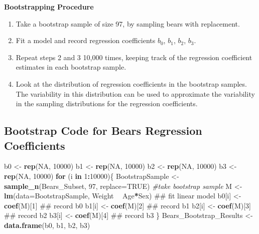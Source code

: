 \documentclass[]{book}
\newenvironment{Shaded}{\begin{snugshade}}{\end{snugshade}}
\newcommand{\KeywordTok}[1]{\textcolor[rgb]{0.13,0.29,0.53}{\textbf{#1}}}
\newcommand{\DataTypeTok}[1]{\textcolor[rgb]{0.13,0.29,0.53}{#1}}
\newcommand{\DecValTok}[1]{\textcolor[rgb]{0.00,0.00,0.81}{#1}}
\newcommand{\StringTok}[1]{\textcolor[rgb]{0.31,0.60,0.02}{#1}}
\newcommand{\CommentTok}[1]{\textcolor[rgb]{0.56,0.35,0.01}{\textit{#1}}}
\newcommand{\OtherTok}[1]{\textcolor[rgb]{0.56,0.35,0.01}{#1}}
\newcommand{\ControlFlowTok}[1]{\textcolor[rgb]{0.13,0.29,0.53}{\textbf{#1}}}
\newcommand{\OperatorTok}[1]{\textcolor[rgb]{0.81,0.36,0.00}{\textbf{#1}}}
\newcommand{\NormalTok}[1]{#1}
\begin{document}
\textbf{Bootstrapping Procedure}

\begin{enumerate}
\def\labelenumi{\arabic{enumi}.}
\item
  Take a bootstrap sample of size 97, by sampling bears with
  replacement.
\item
  Fit a model and record regression coefficients \(b_0\), \(b_1\),
  \(b_2\), \(b_3\).
\item
  Repeat steps 2 and 3 10,000 times, keeping track of the regression
  coefficient estimates in each bootstrap sample.
\item
  Look at the distribution of regression coefficients in the bootstrap
  samples. The variability in this distribution can be used to
  approximate the variability in the sampling distributions for the
  regression coefficients.
\end{enumerate}

\subsection{Bootstrap Code for Bears Regression
Coefficients}\label{bootstrap-code-for-bears-regression-coefficients}

\begin{Shaded}
\begin{Highlighting}[]
\NormalTok{b0 <-}\StringTok{ }\KeywordTok{rep}\NormalTok{(}\OtherTok{NA}\NormalTok{, }\DecValTok{10000}\NormalTok{)}
\NormalTok{b1 <-}\StringTok{ }\KeywordTok{rep}\NormalTok{(}\OtherTok{NA}\NormalTok{, }\DecValTok{10000}\NormalTok{)}
\NormalTok{b2 <-}\StringTok{ }\KeywordTok{rep}\NormalTok{(}\OtherTok{NA}\NormalTok{, }\DecValTok{10000}\NormalTok{)}
\NormalTok{b3 <-}\StringTok{ }\KeywordTok{rep}\NormalTok{(}\OtherTok{NA}\NormalTok{, }\DecValTok{10000}\NormalTok{)}
\ControlFlowTok{for}\NormalTok{ (i }\ControlFlowTok{in} \DecValTok{1}\OperatorTok{:}\DecValTok{10000}\NormalTok{)\{}
\NormalTok{BootstrapSample <-}\StringTok{ }\KeywordTok{sample_n}\NormalTok{(Bears_Subset, }\DecValTok{97}\NormalTok{, }\DataTypeTok{replace=}\OtherTok{TRUE}\NormalTok{) }\CommentTok{#take bootstrap sample}
\NormalTok{M <-}\StringTok{ }\KeywordTok{lm}\NormalTok{(}\DataTypeTok{data=}\NormalTok{BootstrapSample, Weight }\OperatorTok{~}\StringTok{ }\NormalTok{Age}\OperatorTok{*}\NormalTok{Sex) ## fit linear model}
\NormalTok{b0[i] <-}\StringTok{ }\KeywordTok{coef}\NormalTok{(M)[}\DecValTok{1}\NormalTok{] ## record b0}
\NormalTok{b1[i] <-}\StringTok{ }\KeywordTok{coef}\NormalTok{(M)[}\DecValTok{2}\NormalTok{] ## record b1}
\NormalTok{b2[i] <-}\StringTok{ }\KeywordTok{coef}\NormalTok{(M)[}\DecValTok{3}\NormalTok{] ## record b2}
\NormalTok{b3[i] <-}\StringTok{ }\KeywordTok{coef}\NormalTok{(M)[}\DecValTok{4}\NormalTok{] ## record b3}
\NormalTok{\}}
\NormalTok{Bears_Bootstrap_Results <-}\StringTok{ }\KeywordTok{data.frame}\NormalTok{(b0, b1, b2, b3)}
\end{Highlighting}
\end{Shaded}
\end{document}
